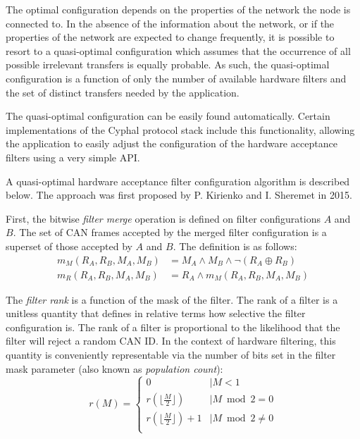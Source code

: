 \begin{remark}[breakable]
    The optimal configuration depends on the properties of the network the node is connected to.
    In the absence of the information about the network,
    or if the properties of the network are expected to change frequently,
    it is possible to resort to a quasi-optimal configuration which assumes that
    the occurrence of all possible irrelevant transfers is equally probable.
    As such, the quasi-optimal configuration is a function of only the number of available hardware filters
    and the set of distinct transfers needed by the application.

    The quasi-optimal configuration can be easily found automatically.
    Certain implementations of the Cyphal protocol stack include this functionality,
    allowing the application to easily adjust the configuration of the hardware acceptance filters
    using a very simple API.

    A quasi-optimal hardware acceptance filter configuration algorithm is described below.
    The approach was first proposed by P. Kirienko and I. Sheremet in 2015.

    First, the bitwise \emph{filter merge} operation is defined on filter configurations $A$ and $B$.
    The set of CAN frames accepted by the merged filter configuration is a superset of
    those accepted by $A$ and $B$.
    The definition is as follows:
    \begin{equation*}
    \begin{split}
        m_M(R_A, R_B, M_A, M_B) & = M_A \land M_B \land \neg (R_A \oplus R_B) \\
        m_R(R_A, R_B, M_A, M_B) & = R_A \land m_M(R_A, R_B, M_A, M_B)
    \end{split}
    \end{equation*}

    The \emph{filter rank} is a function of the mask of the filter.
    The rank of a filter is a unitless quantity that defines in relative terms how selective the filter
    configuration is.
    The rank of a filter is proportional to the likelihood that the filter will reject a random CAN ID.
    In the context of hardware filtering, this quantity is conveniently representable via the number of bits set in
    the filter mask parameter (also known as \emph{population count}):
    \begin{equation*}
    r(M) =
    \begin{cases}
        0                                   &\mid M < 1 \\
        r(\lfloor\frac{M}{2}\rfloor)        &\mid M \bmod 2 = 0 \\
        r(\lfloor\frac{M}{2}\rfloor) + 1    &\mid M \bmod 2 \neq 0 \\
    \end{cases}
    \end{equation*}


\end{remark}
